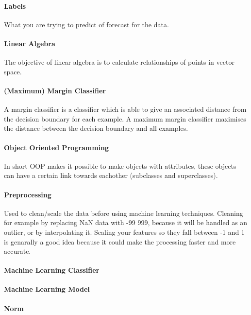 \paragraph{Labels} 
What you are trying to predict of forecast for the data.

\paragraph{Linear Algebra} 
The objective of linear algebra is to calculate relationships of points in vector space. 

\paragraph{(Maximum) Margin Classifier}
A margin classifier is a classifier which is able to give an associated distance from the decision boundary for each example. A maximum margin classifier maximises the distance between the decision boundary and all examples.

\paragraph{Object Oriented Programming}
In short OOP makes it possible to make objects with attributes, these objects can have a certain link towards eachother (subclasses and superclasses).

\paragraph{Preprocessing} 
Used to clean/scale the data before using machine learning techniques. Cleaning for example by replacing NaN data with -99 999, because it will be handled as an outlier, or by interpolating it. Scaling your features so they fall between -1 and 1 is genarally a good idea because it could make the processing faster and more accurate.

\paragraph{Machine Learning Classifier} 

\paragraph{Machine Learning Model} 

\paragraph{Norm} 

